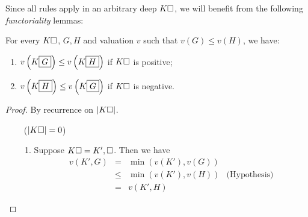 \begin{scope}
Since all rules apply in an arbitrary deep  $K\square$, we will benefit
from the following \emph{functoriality} lemmas:


\begin{lemma}[Variance]
  
  For every  $K\square$,  $G, H$ and valuation $v$ such that $v(G)
  \leq v(H)$, we have:
  \begin{enumerate}
    \item $v\left(K\fbox{$G$}\right) \leq v\left(K\fbox{$H$}\right)$ if $K\square$
    is positive;
    \item $v\left(K\fbox{$H$}\right) \leq v\left(K\fbox{$G$}\right)$ if $K\square$
    is negative.
  \end{enumerate}
\end{lemma}
\begin{proof}
  By recurrence on $\left|K\square\right|$.

  \def\arraystretch{1.5}
  \begin{itemize}
    \item[\bcase~($\left|K\square\right| = 0$)]\sbr
      \begin{enumerate}
        \item Suppose $K\square = K', \square$. Then we have
        $$
        \begin{array}{rcll}
          v(K', G)
          &=& \min(v(K'), v(G)) & \\
          &\leq& \min(v(K'), v(H)) &\text{(Hypothesis)} \\
          &=& v(K', H) &
        \end{array}
        $$


\end{enumerate}
\end{itemize}
\end{proof}
\end{scope}
